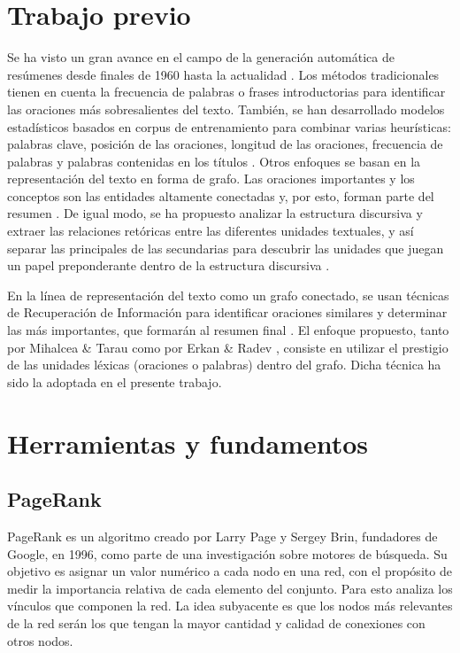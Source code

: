 \documentclass[a4paper]{article}
\begin{document}
\section{Trabajo previo}
Se ha visto un gran avance en el campo de la generación automática de resúmenes desde finales de 1960 hasta la actualidad \cite{miranda}. Los métodos tradicionales tienen en cuenta la frecuencia de palabras o frases introductorias para identificar las oraciones más sobresalientes del texto. También, se han desarrollado modelos estadísticos basados en corpus de entrenamiento para combinar varias heurísticas: palabras clave, posición de las oraciones, longitud de las oraciones, frecuencia de palabras y palabras contenidas en los títulos \cite{hovy}. Otros enfoques se basan en la representación del texto en forma de grafo. Las oraciones importantes y los conceptos son las entidades altamente conectadas y, por esto, forman parte del resumen \cite{barzilay}. De igual modo, se ha propuesto analizar la estructura discursiva y extraer las relaciones retóricas entre las diferentes unidades textuales, y así separar las principales de las secundarias para descubrir las unidades que juegan un papel preponderante dentro de la estructura discursiva \cite{marcu}.

En la línea de representación del texto como un grafo conectado, se usan técnicas de Recuperación de Información para identificar oraciones similares y determinar las más importantes, que formarán al resumen final \cite{salton}. El enfoque propuesto, tanto por Mihalcea \& Tarau como por Erkan \& Radev \cite{erkan}, consiste en utilizar el prestigio de las unidades léxicas (oraciones o palabras) dentro del grafo. Dicha técnica ha sido la adoptada en el presente trabajo.


\section{Herramientas y fundamentos}

\subsection{PageRank}
PageRank es un algoritmo creado por Larry Page y Sergey Brin, fundadores de Google, en 1996, como parte de una investigación sobre motores de búsqueda. Su objetivo es asignar un valor numérico a cada nodo en una red, con el propósito de medir la importancia relativa de cada elemento del conjunto. Para esto analiza los vínculos que componen la red. La idea subyacente es que los nodos más relevantes de la red serán los que tengan la mayor cantidad y calidad de conexiones con otros nodos. 
\end{document}
